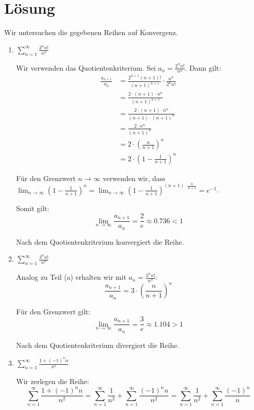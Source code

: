 \documentclass[11pt]{article}
\begin{document}
\section*{Lösung}

Wir untersuchen die gegebenen Reihen auf Konvergenz.

\begin{enumerate}[label=(\alph*)]

\item $\displaystyle \sum_{n=1}^\infty \frac{2^n n!}{n^n}$

Wir verwenden das Quotientenkriterium. Sei $a_n = \frac{2^n n!}{n^n}$. Dann gilt:
\begin{align}
\frac{a_{n+1}}{a_n} &= \frac{2^{n+1} (n+1)!}{(n+1)^{n+1}} \cdot \frac{n^n}{2^n n!}\\
&= \frac{2 \cdot (n+1) \cdot n^n}{(n+1)^{n+1}}\\
&= \frac{2 \cdot (n+1) \cdot n^n}{(n+1) \cdot (n+1)^n}\\
&= \frac{2 \cdot n^n}{(n+1)^n}\\
&= 2 \cdot \left(\frac{n}{n+1}\right)^n\\
&= 2 \cdot \left(1 - \frac{1}{n+1}\right)^n
\end{align}

Für den Grenzwert $n \to \infty$ verwenden wir, dass $\lim_{n \to \infty} \left(1 - \frac{1}{n+1}\right)^n = \lim_{n \to \infty} \left(1 - \frac{1}{n+1}\right)^{(n+1) \cdot \frac{n}{n+1}} = e^{-1}$.

Somit gilt:
\[
\lim_{n \to \infty} \frac{a_{n+1}}{a_n} = \frac{2}{e} \approx 0.736 < 1
\]

Nach dem Quotientenkriterium konvergiert die Reihe.

\item $\displaystyle \sum_{n=1}^\infty \frac{3^n n!}{n^n}$

Analog zu Teil (a) erhalten wir mit $a_n = \frac{3^n n!}{n^n}$:
\[
\frac{a_{n+1}}{a_n} = 3 \cdot \left(\frac{n}{n+1}\right)^n
\]

Für den Grenzwert gilt:
\[
\lim_{n \to \infty} \frac{a_{n+1}}{a_n} = \frac{3}{e} \approx 1.104 > 1
\]

Nach dem Quotientenkriterium divergiert die Reihe.

\item $\displaystyle \sum_{n=1}^\infty \frac{1 + (-1)^n n}{n^2}$

Wir zerlegen die Reihe:
\[
\sum_{n=1}^\infty \frac{1 + (-1)^n n}{n^2} = \sum_{n=1}^\infty \frac{1}{n^2} + \sum_{n=1}^\infty \frac{(-1)^n n}{n^2} = \sum_{n=1}^\infty \frac{1}{n^2} + \sum_{n=1}^\infty \frac{(-1)^n}{n}
\]


\end{enumerate}
\end{document}
